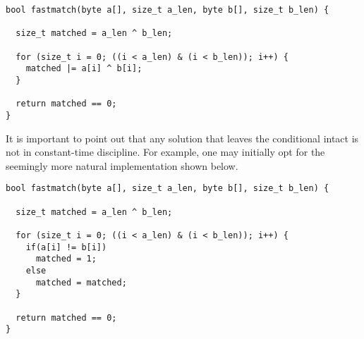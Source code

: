 \documentclass[11pt,twoside]{scrartcl}
\begin{document}
\clearpage

\lstset{language=C}
\begin{lstlisting}
bool fastmatch(byte a[], size_t a_len, byte b[], size_t b_len) {
  
  size_t matched = a_len ^ b_len;

  for (size_t i = 0; ((i < a_len) & (i < b_len)); i++) {
    matched |= a[i] ^ b[i];
  }
 
  return matched == 0;
}
\end{lstlisting}

It is important to point out that any solution that leaves the conditional intact is not in constant-time discipline. For example, one may initially opt for the seemingly more natural implementation shown below.

\lstset{language=C}
\begin{lstlisting}
bool fastmatch(byte a[], size_t a_len, byte b[], size_t b_len) {
  
  size_t matched = a_len ^ b_len;

  for (size_t i = 0; ((i < a_len) & (i < b_len)); i++) {
    if(a[i] != b[i]) 
      matched = 1;
    else
      matched = matched;
  }
 
  return matched == 0;
}
\end{lstlisting}
\end{document}

